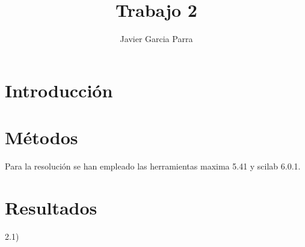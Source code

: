 \documentclass[fleqn,10pt]{wlscirep}
\title{Trabajo 2}
\author[50201633Q / jgarcia1285 ]{Javier Garcia Parra}
\begin{document}
\flushbottom
\maketitle
%
%
\thispagestyle{empty}


\section{Introducción}\label{introducciuxf3n}

\section{Métodos}\label{muxe9todos}

Para la resolución se han empleado las herramientas maxima 5.41 y scilab
6.0.1.

\section{Resultados}\label{resultados}

2.1)
\end{document}
